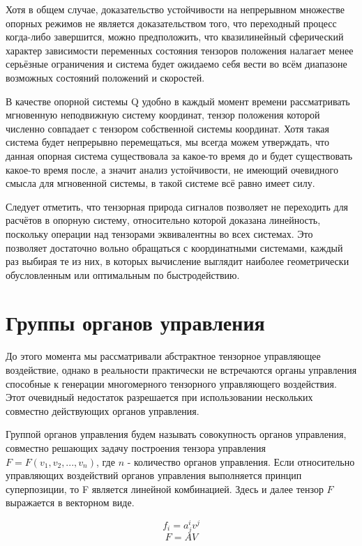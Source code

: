 \documentclass[a4paper]{article}
\begin{document}
Хотя в общем случае, доказательство устойчивости на непрерывном множестве опорных режимов не является доказательством того, что переходный процесс когда-либо завершится, можно предположить, что квазилинейный сферический характер зависимости переменных состояния тензоров положения налагает менее серьёзные ограничения и система будет ожидаемо себя вести во всём диапазоне возможных состояний положений и скоростей.

В качестве опорной системы Q удобно в каждый момент времени рассматривать мгновенную неподвижную систему координат, тензор положения которой численно совпадает с тензором собственной системы координат. Хотя такая система будет непрерывно перемещаться, мы всегда можем утверждать, что данная опорная система существовала за какое-то время до и будет существовать какое-то время после, а значит анализ устойчивости, не имеющий очевидного смысла для мгновенной системы, в такой системе всё равно имеет силу. 

Следует отметить, что тензорная природа сигналов позволяет не переходить для расчётов в опорную систему, относительно которой доказана линейность, поскольку операции над тензорами эквивалентны во всех системах. Это позволяет достаточно вольно обращаться с координатными системами, каждый раз выбирая те из них, в которых вычисление выглядит наиболее геометрически обусловленным или оптимальным по быстродействию.

\section{Группы органов управления}
До этого момента мы рассматривали абстрактное тензорное управляющее воздействие, однако в реальности практически не встречаются органы управления способные к генерации многомерного тензорного управляющего воздействия. Этот очевидный недостаток разрешается при использовании нескольких совместно действующих органов управления.

Группой органов управления будем называть совокупность органов управления, совместно решающих задачу построения тензора управления $F = F(v_1, v_2, ..., v_n)$, где $n$ - количество органов управления. Если относительно управляющих воздействий органов управления выполняется принцип суперпозиции, то F является линейной комбинацией. Здесь и далее тензор $F$ выражается в векторном виде. 

\begin{equation}f_i=a^i_jv^j\end{equation}
\begin{equation} \label{lincomb}  F=AV\end{equation}
\end{document}
